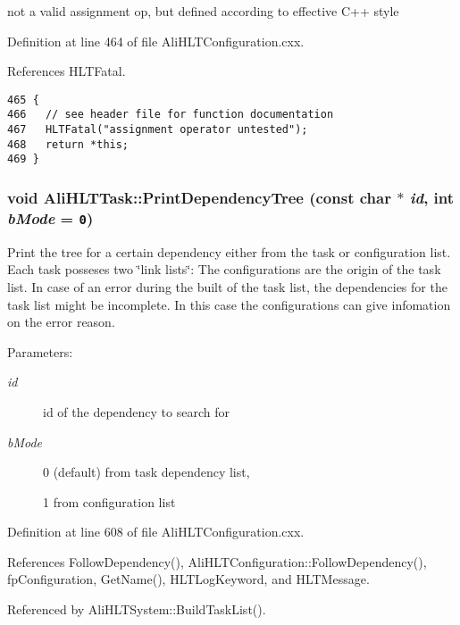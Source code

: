 not a valid assignment op, but defined according to effective C++ style 

Definition at line 464 of file Ali\-HLTConfiguration.cxx.

References HLTFatal.

\footnotesize\begin{verbatim}465 { 
466   // see header file for function documentation
467   HLTFatal("assignment operator untested");
468   return *this;
469 }
\end{verbatim}\normalsize 


\subsubsection{\setlength{\rightskip}{0pt plus 5cm}void Ali\-HLTTask::Print\-Dependency\-Tree (const char $\ast$ {\em id}, int {\em b\-Mode} = {\tt 0})}\label{classAliHLTTask_a27}


Print the tree for a certain dependency either from the task or configuration list. Each task posseses two \char`\"{}link lists\char`\"{}: The configurations are the origin of the task list. In case of an error during the built of the task list, the dependencies for the task list might be incomplete. In this case the configurations can give infomation on the error reason. \begin{Desc}
\item[Parameters:]
\begin{description}
\item[{\em id}]id of the dependency to search for \item[{\em b\-Mode}]0 (default) from task dependency list, \par
 1 from configuration list \end{description}
\end{Desc}


Definition at line 608 of file Ali\-HLTConfiguration.cxx.

References Follow\-Dependency(), Ali\-HLTConfiguration::Follow\-Dependency(), fp\-Configuration, Get\-Name(), HLTLog\-Keyword, and HLTMessage.

Referenced by Ali\-HLTSystem::Build\-Task\-List().

